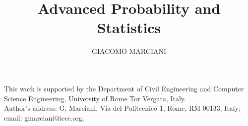 \documentclass[prodmode,gmlecture]{acmlarge}
\title{Advanced Probability and Statistics}
\author{GIACOMO MARCIANI \affil{University of Rome Tor Vergata}}
\numberwithin{equation}{section}
\begin{document}
\begin{bottomstuff}
	This work is supported by the Department of Civil Engineering and Computer Science
	Engineering, University of Rome Tor Vergata, Italy.\\
	Author's address: G. Marciani, Via del Politecnico 1, Rome, RM 00133, Italy;
	email: gmarciani@ieee.org.
\end{bottomstuff}

\maketitle

%
%
%

%
%



\end{document}
